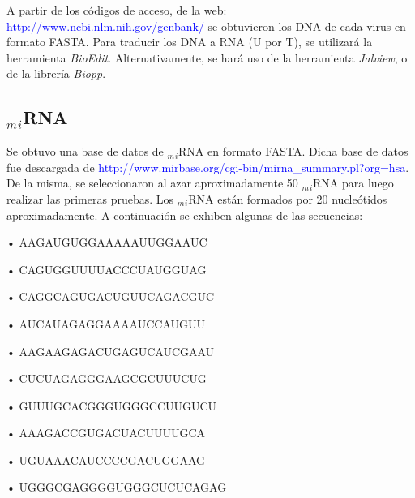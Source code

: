\documentclass[12pt,a4paper,spanish]{article}
\begin{document}
		\par A partir de los códigos de acceso, de la web: \textcolor{blue}{http://www.ncbi.nlm.nih.gov/genbank/} se 			obtuvieron los DNA de cada virus en formato FASTA. Para traducir los DNA a RNA (\textsc{U} por \textsc{T}), se 			utilizará la herramienta \textit{BioEdit}. Alternativamente, se hará uso de la herramienta \textit{Jalview}, o de 			la librería \textit{Biopp}. 

	\subsection{$_m$$_i$RNA}
		\par Se obtuvo una base de datos de $_m$$_i$RNA en formato FASTA. Dicha base de datos fue descargada de
		\textcolor{blue}{http://www.mirbase.org/cgi-bin/mirna\_summary.pl?org=hsa}. De la misma, se seleccionaron al azar 		aproximadamente 50 $_m$$_i$RNA para luego realizar las primeras pruebas. Los $_m$$_i$RNA están formados por 20 			nucleótidos aproximadamente. A continuación se exhiben algunas de las secuencias: 
			\vskip 0.5cm
			\par \hspace*{1cm} • \textsc{AAGAUGUGGAAAAAUUGGAAUC}
			\vskip 0.20cm
			\par \hspace*{1cm} • \textsc{CAGUGGUUUUACCCUAUGGUAG}
			\vskip 0.20cm
			\par \hspace*{1cm} • \textsc{CAGGCAGUGACUGUUCAGACGUC}
			\vskip 0.20cm
			\par \hspace*{1cm} • \textsc{AUCAUAGAGGAAAAUCCAUGUU}
			\vskip 0.20cm
			\par \hspace*{1cm} • \textsc{AAGAAGAGACUGAGUCAUCGAAU}
			\vskip 0.20cm
			\par \hspace*{1cm} • \textsc{CUCUAGAGGGAAGCGCUUUCUG}
			\vskip 0.20cm
			\par \hspace*{1cm} • \textsc{GUUUGCACGGGUGGGCCUUGUCU}
			\vskip 0.20cm
			\par \hspace*{1cm} • \textsc{AAAGACCGUGACUACUUUUGCA}
			\vskip 0.20cm
			\par \hspace*{1cm} • \textsc{UGUAAACAUCCCCGACUGGAAG}
			\vskip 0.20cm
			\par \hspace*{1cm} • \textsc{UGGGCGAGGGGUGGGCUCUCAGAG} 
			\vskip 0.5cm
\end{document}
